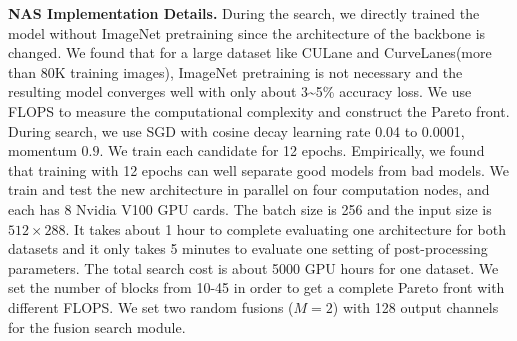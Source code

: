 \documentclass[runningheads]{llncs}
\begin{document}
\textbf{NAS Implementation Details.} 
During the search, we directly trained the model without ImageNet
pretraining since the architecture of the backbone is changed. We
found that for a large dataset like CULane and CurveLanes(more than
80K training images), ImageNet pretraining is not necessary and the
resulting model converges well with only about 3\textasciitilde 5\%
accuracy loss. We use FLOPS to measure the computational complexity and construct the Pareto front.
During search, we use SGD with cosine decay learning
rate 0.04 to 0.0001, momentum $0.9$. We train each candidate for
12 epochs. Empirically, we found that training with 12 epochs can
well separate good models from bad models. We train and test the new
architecture in parallel on four computation nodes, and each has 8
Nvidia V100 GPU cards. The batch size is 256 and the input size is
$512\times288$. It takes about 1 hour to complete evaluating one
architecture for both datasets and it only takes 5 minutes to evaluate
one setting of post-processing parameters. The total search cost is
about 5000 GPU hours for one dataset. We set the number of blocks
from 10-45 in order to get a complete Pareto front with different
FLOPS. We set two random fusions ($M=2$) with 128 output channels
for the fusion search module.
\end{document}
